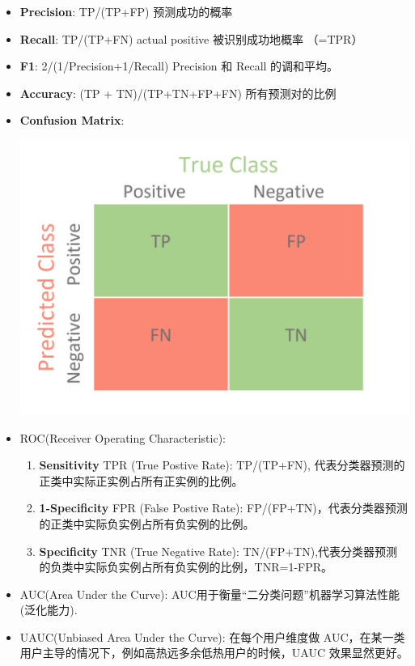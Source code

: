\documentclass[12pt]{article}
\numberwithin{theorem}{section} %
\numberwithin{definition}{section} %
\numberwithin{assumption}{section} %
\numberwithin{lemma}{section} %
\numberwithin{remark}{section} %
\numberwithin{prop}{section} %
\numberwithin{corollary}{section} %
\numberwithin{example}{section} %
\numberwithin{question}{section} %
\numberwithin{problem}{section} %
\numberwithin{conjecture}{section} %
\numberwithin{append}{section} %
\numberwithin{property}{section} %
\def\csplit{\mathcal{S}}   %
\begin{document}
\begin{CJK}{UTF8}{gbsn}
	\begin{itemize}
		\item \textbf{Precision}: TP/(TP+FP) 预测成功的概率
		\item \textbf{Recall}: TP/(TP+FN) actual positive 被识别成功地概率 （=TPR）
		\item \textbf{F1}: 2/(1/Precision+1/Recall) Precision 和 Recall 的调和平均。
		\item \textbf{Accuracy}: (TP + TN)/(TP+TN+FP+FN) 所有预测对的比例
		\item \textbf{Confusion Matrix}: 
		\begin{center}
			\includegraphics[scale=0.3]{pics/confusionmatrix.png}
			\captionof{figure}{$\csplit^{\pi}$}
		\end{center}
		\item ROC(Receiver Operating Characteristic): 
		\begin{enumerate}
			\item \textbf{Sensitivity} TPR (True Postive Rate): TP/(TP+FN), 代表分类器预测的正类中实际正实例占所有正实例的比例。
			\item \textbf{1-Specificity} FPR (False Postive Rate): FP/(FP+TN)，代表分类器预测的正类中实际负实例占所有负实例的比例。
			\item \textbf{Specificity} TNR (True Negative Rate): TN/(FP+TN),代表分类器预测的负类中实际负实例占所有负实例的比例，TNR=1-FPR。
		\end{enumerate}
		\item AUC(Area Under the Curve): AUC用于衡量“二分类问题”机器学习算法性能(泛化能力).
		\item UAUC(Unbiased Area Under the Curve): 在每个用户维度做 AUC，在某一类用户主导的情况下，例如高热远多余低热用户的时候，UAUC 效果显然更好。
	\end{itemize}
	

\end{CJK}
\end{document}
